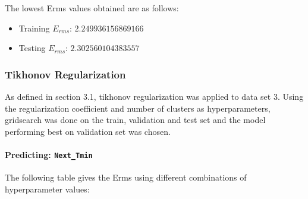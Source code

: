 \documentclass[12pt,a4paper]{article}
\newcommand{\noi}{\noindent}
\def\tt#1{\texttt{#1}}
\begin{document}
\noi
The lowest Erms values obtained are as follows:
\begin{itemize}
    \itemsep0em
    \item Training $E_{rms}$: $2.249936156869166$
    \item Testing $E_{rms}$: $2.302560104383557$
\end{itemize}

\subsubsection{Tikhonov Regularization} 
As defined in section 3.1, tikhonov regularization was applied to data set 3. Using the regularization coefficient and number of clusters as hyperparameters, gridsearch was done on the train, validation and test set and the model performing best on validation set was chosen. 
\paragraph{Predicting: \tt{Next\_Tmin}}
The following table gives the Erms using different combinations of hyperparameter values:
\end{document}

